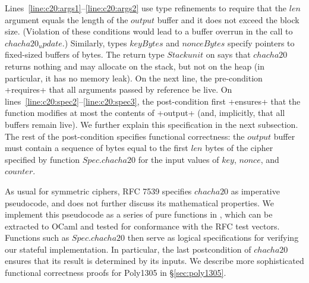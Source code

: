 Lines~\ref{line:c20:args1}--\ref{line:c20:args2} use type refinements to require that the
\lst$len$ argument equals the length of the \lst$output$ buffer and it does not
exceed the block size. (Violation of these conditions would
lead to a buffer overrun in the call to \lst$chacha20_update$.)
%
Similarly, types \lst$keyBytes$ and \lst$nonceBytes$ specify
pointers to fixed-sized buffers of bytes.
%
The return type \lst$Stack unit$ on  
says that \lst$chacha20$ returns
nothing and may allocate on the stack, but not on the heap (in
particular, it has no memory leak).
%
On the next line, the pre-condition \li+requires+ that all arguments
passed by reference
be live.
%
On lines~\ref{line:c20:spec2}--\ref{line:c20:spec3}, the post-condition 
first \li+ensures+ that the function modifies at most the contents of \li+output+ (and, 
implicitly, that all buffers remain live).
%
We further explain this specification in the next subsection.
%
The rest of the post-condition specifies functional correctness:
the \lst$output$ buffer must contain a sequence of bytes
equal to the first \lst$len$ bytes of the cipher specified by 
function \lst$Spec.chacha20$ for the input values of \lst$key$, \lst$nonce$, and \lst$counter$.

As usual for symmetric ciphers, RFC 7539 specifies \lst$chacha20$ as
imperative pseudocode, and does not further discuss its mathematical
properties.
%
We implement this pseudocode as a series of pure functions in 
\fstar, which can be extracted to OCaml and tested for conformance 
with the RFC test vectors.
%
Functions such as \lst$Spec.chacha20$ then serve as logical
specifications for verifying our stateful implementation. 
%
In particular, the last postcondition of \lst$chacha20$ ensures that
its result is determined by its inputs.
%
We describe more sophisticated functional correctness proofs 
for Poly1305 in \S\ref{sec:poly1305}.




